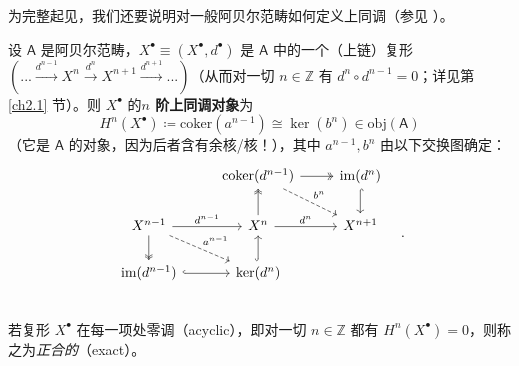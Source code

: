 
为完整起见，我们还要说明对一般阿贝尔范畴如何定义上同调（参见 \cite[subsections II.6.2--II.6.3]{[GM03]}）。

\begin{Def}\label{abeliancohomology}
	设 $\mathsf{A}$ 是阿贝尔范畴，$X^\bullet\equiv(X^\bullet,d^\bullet)$ 是 $\mathsf{A}$ 中的一个（上链）复形 $(...\xrightarrow{d^{n-1}}X^n\xrightarrow{d^n}X^{n+1}\xrightarrow{d^{n+1}}...)$（从而对一切 $n\in\mathbb{Z}$ 有 $d^n\circ d^{n-1}=0$；详见第 \ref{ch2.1} 节）。则 $X^\bullet$ 的\textbf{$n$ 阶上同调对象}为
	\[
	H^n(X^\bullet)\coloneqq \text{coker}(a^{n-1})\cong\ker(b^n)\in\text{obj}(\mathsf{A})
	\]
	（它是 $\mathsf{A}$ 的对象，因为后者含有余核/核！），其中 $a^{n-1}, b^n$ 由以下交换图确定：
	\begin{equation}\label{cohomodiag}
		\begin{tikzcd}
			& \text{coker}(d^{n-1})\arrow[dr, dashed, "b^n"]\arrow[r, two heads] & \text{im}(d^n)\arrow[d, hook] \\
			X^{n-1}\arrow[r, "d^{n-1}"]\arrow[dr, dashed, "a^{n-1}"]\arrow[d, two heads] & X^n\arrow[u, two heads]\arrow[r, "d^n"] & X^{n+1} \\
			\text{im}(d^{n-1})\arrow[r, hook]& \ker(d^n)\arrow[u, hook] & \\
		\end{tikzcd}\quad.\vspace*{-0.5cm}
	\end{equation}
	若复形 $X^\bullet$ 在每一项处零调（acyclic），即对一切 $n\in\mathbb{Z}$ 都有 $H^n(X^\bullet)=0$，则称之为\textit{正合的}（exact）。
\end{Def}


